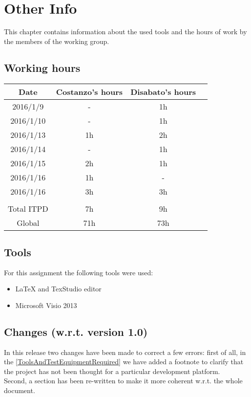\documentclass[\mainpath/main]{subfiles}
\begin{document}
\chapter{Other Info}
\label{OtherInfo}

\setmyfancystyle

This chapter contains information about the used tools and the hours of work by the members of the working group.

\section{Working hours}
\begin{table}[h!]
	\centering
\begin{tabular}{cccc}
\hline
Date     	& Costanzo's hours & Disabato's hours  & \\ \hline
2016/1/9 	& -			  	   & 1h 			   & \\ \hline
2016/1/10	& - 		  	   & 1h 			   & \\ \hline
2016/1/13	& 1h 		  	   & 2h 			   & \\ \hline
2016/1/14 	& - 		  	   & 1h 			   & \\ \hline
2016/1/15 	& 2h 		 	   & 1h 			   & \\ \hline
2016/1/16 	& 1h 		 	   & -	 			   & \\ \hline
2016/1/16 	& 3h 		 	   & 3h	 			   & \\ \hline
\\
Total ITPD  & 7h 		 	   & 9h 			   & \\ \hline
Global 	    & 71h 		 	   & 73h 			   & \\ \hline

\end{tabular}
\end{table}

\clearpage

\section{Tools}
For this assignment the following tools were used:
\begin{itemize}
	\item \LaTeX{} and TexStudio editor
	\item Microsoft Visio 2013
\end{itemize}

\section{Changes (w.r.t. version 1.0)}
In this release two changes have been made to correct a few errors: first of all, in the \autoref{ToolsAndTestEquipmentRequired} we have added a footnote to clarify that the project has not been thought for a particular development platform.\\
Second, a section has been re-written to make it more coherent w.r.t. the whole document.
\end{document}
